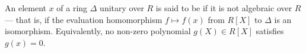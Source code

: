 An element $x$ of a ring $\Delta$ unitary over $R$ is said to be  if it is not algebraic over $R$ — that is, if the evaluation homomorphism $f \mapsto f(x)$ from $R[X]$ to $\Delta$ is an isomorphism. Equivalently, no non-zero polynomial $g(X) \in R[X]$ satisfies $g(x) = 0$.
